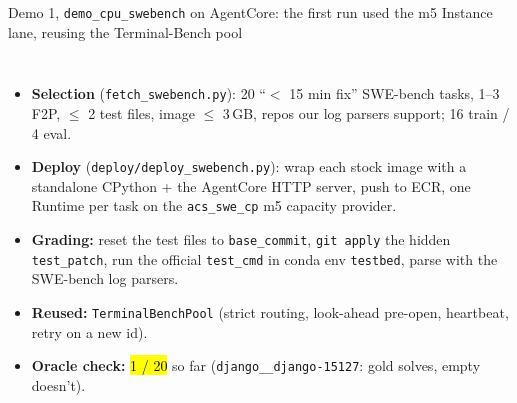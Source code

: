 \begin{frame}{Demo 1, \texttt{demo\_cpu\_swebench} on AgentCore: the first run used the m5 Instance lane, reusing the Terminal-Bench pool}
\begin{columns}[T]
\begin{itemize}\footnotesize\setlength{\itemsep}{1.2mm}
\item \textbf{Selection} (\texttt{fetch\_swebench.py}): 20 ``$<$ 15 min fix'' SWE-bench tasks, 1--3 F2P, $\le$ 2 test files, image $\le$ 3\,GB, repos our log parsers support; 16 train / 4 eval.
\item \textbf{Deploy} (\texttt{deploy/deploy\_swebench.py}): wrap each stock image with a standalone CPython + the AgentCore HTTP server, push to ECR, one Runtime per task on the \texttt{acs\_swe\_cp} m5 capacity provider.
\item \textbf{Grading:} reset the test files to \texttt{base\_commit}, \texttt{git apply} the hidden \texttt{test\_patch}, run the official \texttt{test\_cmd} in conda env \texttt{testbed}, parse with the SWE-bench log parsers.
\item \textbf{Reused:} \texttt{TerminalBenchPool} (strict routing, look-ahead pre-open, heartbeat, retry on a new id).
\item \textbf{Oracle check:} \hl{1 / 20} so far (\texttt{django\_\_django-15127}: gold solves, empty doesn't).
\end{itemize}
\vspace{4mm}
\centering
{}
\end{columns}
\end{frame}

